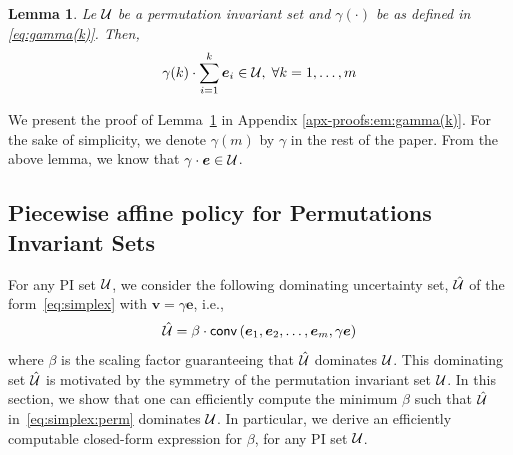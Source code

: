 \documentclass[11pt]{article}
\theoremstyle{plain}
\newtheorem{lemma}[theorem]{Lemma}
\theoremstyle{definition}
\numberwithin{equation}{section}%
\numberwithin{equation}{section}%
\newcommand{\mb}[1]{\ensuremath{\boldsymbol{#1}}}
\begin{document}
\begin{lemma} \label{lem:gamma(k)}
Le ${\cal U}$ be a permutation invariant set and $\gamma (\cdot)$ be as defined in \eqref{eq:gamma(k)}. Then,
$$ \gamma (k) \cdot \sum_{i=1}^k \mb e_i \in {\cal U}, \; \forall k=1,\ldots,m$$
\end{lemma}
We present the proof of Lemma~\ref{lem:gamma(k)} in Appendix \ref{apx-proofs:em:gamma(k)}. For the sake of simplicity, we denote $ \gamma (m)$ by $ \gamma $ in the rest of the paper. From the above lemma, we know that $\gamma \cdot \mb{e} \in {\cal U}$.

\subsection{Piecewise affine policy for Permutations Invariant Sets}
For any PI set ${\cal U}$, we consider the following dominating uncertainty set, $\hat{\cal U}$ of the form~\eqref{eq:simplex} with $\mb v = \gamma \mb{e}$, i.e.,
\begin{equation} \label{eq:simplex:perm}
\hat{\cal U} = \beta\cdot{\sf conv}\left(\mb{e}_1,\mb{e}_2, \ldots,\mb{e}_m, \gamma \mb{e}\right)
\end{equation}
where $\beta$ is the scaling factor guaranteeing that $\hat{\cal U}$ dominates ${\cal U}$. This dominating set $\hat{\cal U}$ is motivated by the symmetry of the permutation invariant set $\cal U$. In this section, we show that one can efficiently compute the minimum $\beta$ such that $\hat{\cal U}$ in~\eqref{eq:simplex:perm} dominates ${\cal U}$. In particular, we derive an efficiently computable closed-form expression for $\beta$, for any PI set ${\cal U}$.
\end{document}
